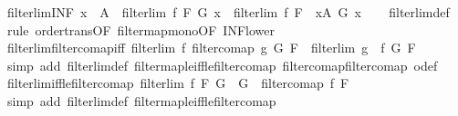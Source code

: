 \begin{isabellebody}
\endisatagproof
{\isafoldproof}%
%
\isadelimproof
\isanewline
%
\endisadelimproof
\isanewline
{}\isamarkupfalse%
\ filterlim{\isacharunderscore}{\kern0pt}INF{\isacharprime}{\kern0pt}{\isacharcolon}{\kern0pt}\ {\isachardoublequoteopen}x\ {\isasymin}\ A\ {\isasymLongrightarrow}\ filterlim\ f\ F\ {\isacharparenleft}{\kern0pt}G\ x{\isacharparenright}{\kern0pt}\ {\isasymLongrightarrow}\ filterlim\ f\ F\ {\isacharparenleft}{\kern0pt}{\isasymSqinter}\ x{\isasymin}A{\isachardot}{\kern0pt}\ G\ x{\isacharparenright}{\kern0pt}{\isachardoublequoteclose}\isanewline
%
\isadelimproof
\ \ %
\endisadelimproof
%
\isatagproof
{}\isamarkupfalse%
\ filterlim{\isacharunderscore}{\kern0pt}def\ \isamarkupfalse%
\ {\isacharparenleft}{\kern0pt}rule\ order{\isachardot}{\kern0pt}trans{\isacharbrackleft}{\kern0pt}OF\ filtermap{\isacharunderscore}{\kern0pt}mono{\isacharbrackleft}{\kern0pt}OF\ INF{\isacharunderscore}{\kern0pt}lower{\isacharbrackright}{\kern0pt}{\isacharbrackright}{\kern0pt}{\isacharparenright}{\kern0pt}%
\endisatagproof
{\isafoldproof}%
%
\isadelimproof
\isanewline
%
\endisadelimproof
\isanewline
{}\isamarkupfalse%
\ filterlim{\isacharunderscore}{\kern0pt}filtercomap{\isacharunderscore}{\kern0pt}iff{\isacharcolon}{\kern0pt}\ {\isachardoublequoteopen}filterlim\ f\ {\isacharparenleft}{\kern0pt}filtercomap\ g\ G{\isacharparenright}{\kern0pt}\ F\ {\isasymlongleftrightarrow}\ filterlim\ {\isacharparenleft}{\kern0pt}g\ {\isasymcirc}\ f{\isacharparenright}{\kern0pt}\ G\ F{\isachardoublequoteclose}\isanewline
%
\isadelimproof
\ \ %
\endisadelimproof
%
\isatagproof
{}\isamarkupfalse%
\ {\isacharparenleft}{\kern0pt}simp\ add{\isacharcolon}{\kern0pt}\ filterlim{\isacharunderscore}{\kern0pt}def\ filtermap{\isacharunderscore}{\kern0pt}le{\isacharunderscore}{\kern0pt}iff{\isacharunderscore}{\kern0pt}le{\isacharunderscore}{\kern0pt}filtercomap\ filtercomap{\isacharunderscore}{\kern0pt}filtercomap\ o{\isacharunderscore}{\kern0pt}def{\isacharparenright}{\kern0pt}%
\endisatagproof
{\isafoldproof}%
%
\isadelimproof
\isanewline
%
\endisadelimproof
\isanewline
{}\isamarkupfalse%
\ filterlim{\isacharunderscore}{\kern0pt}iff{\isacharunderscore}{\kern0pt}le{\isacharunderscore}{\kern0pt}filtercomap{\isacharcolon}{\kern0pt}\ {\isachardoublequoteopen}filterlim\ f\ F\ G\ {\isasymlongleftrightarrow}\ G\ {\isasymle}\ filtercomap\ f\ F{\isachardoublequoteclose}\isanewline
%
\isadelimproof
\ \ %
\endisadelimproof
%
\isatagproof
{}\isamarkupfalse%
\ {\isacharparenleft}{\kern0pt}simp\ add{\isacharcolon}{\kern0pt}\ filterlim{\isacharunderscore}{\kern0pt}def\ filtermap{\isacharunderscore}{\kern0pt}le{\isacharunderscore}{\kern0pt}iff{\isacharunderscore}{\kern0pt}le{\isacharunderscore}{\kern0pt}filtercomap{\isacharparenright}{\kern0pt}%

\end{isabellebody}
